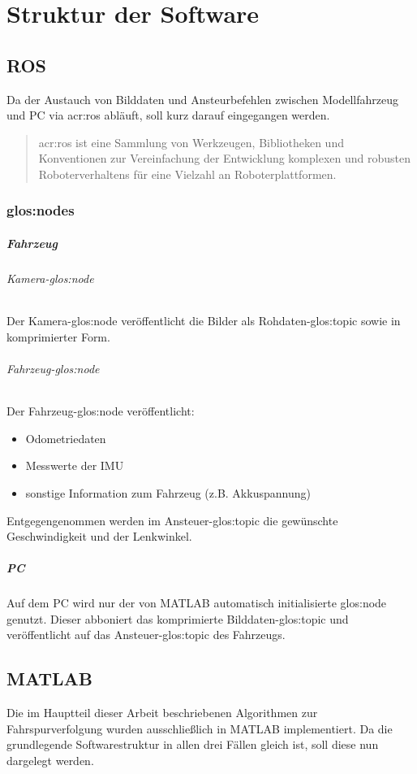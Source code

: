 \chapter{Struktur der Software}

\section{ROS}
Da der Austauch von Bilddaten und Ansteurbefehlen zwischen Modellfahrzeug und PC via \gls{acr:ros} \autocite{ROSOrgPowering} abläuft, soll kurz darauf eingegangen werden. 
\begin{quotation}
\gls{acr:ros} ist eine Sammlung von Werkzeugen, Bibliotheken und Konventionen zur Vereinfachung der Entwicklung komplexen und robusten Roboterverhaltens für eine Vielzahl an Roboterplattformen. \autocite{ROSOrgROS}
\end{quotation}

\subsection{\glspl{glos:node}}
\paragraph{Fahrzeug}
\subparagraph{Kamera-\gls{glos:node}}
Der Kamera-\gls{glos:node} veröffentlicht die Bilder als Rohdaten-\gls{glos:topic} sowie in komprimierter Form.
\subparagraph{Fahrzeug-\gls{glos:node}}
Der Fahrzeug-\gls{glos:node} veröffentlicht:
\begin{itemize}
\item Odometriedaten 
\item Messwerte der IMU
\item sonstige Information zum Fahrzeug (z.B. Akkuspannung)
\end{itemize}
Entgegengenommen werden im Ansteuer-\gls{glos:topic} die gewünschte Geschwindigkeit und der Lenkwinkel.
\paragraph{PC}
Auf dem PC wird nur der von MATLAB automatisch initialisierte \gls{glos:node} genutzt. Dieser abboniert das komprimierte Bilddaten-\gls{glos:topic} und veröffentlicht auf das Ansteuer-\gls{glos:topic} des Fahrzeugs.

\section{MATLAB}
Die im Hauptteil dieser Arbeit beschriebenen Algorithmen zur Fahrspurverfolgung wurden ausschließlich in MATLAB implementiert. Da die grundlegende Softwarestruktur in allen drei Fällen gleich ist, soll diese nun dargelegt werden.


